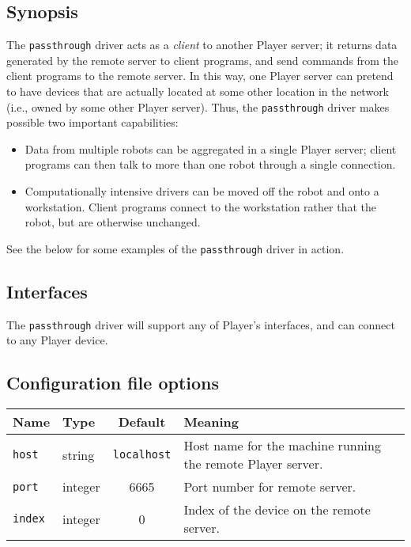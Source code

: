
\subsection*{Synopsis}

The {\tt passthrough} driver acts as a {\em client} to another Player
server; it returns data generated by the remote server to client
programs, and send commands from the client programs to the remote
server.  In this way, one Player server can pretend to have devices
that are actually located at some other location in the network (i.e.,
owned by some other Player server).  Thus, the {\tt passthrough}
driver makes possible two important capabilities:
\begin{itemize}
\item Data from multiple robots can be aggregated in a single Player
server; client programs can then talk to more than one robot through a
single connection.
\item Computationally intensive drivers can be moved off the robot and
onto a workstation.  Client programs connect to the workstation rather
that the robot, but are otherwise unchanged.
\end{itemize}
See the below for some examples of the {\tt passthrough} driver in
action.

\subsection*{Interfaces}

The {\tt passthrough} driver will support any of Player's interfaces,
and can connect to any Player device.


\subsection*{Configuration file options}

\begin{center}
{\small \begin{tabularx}{\columnwidth}{|l|l|c|X|}
\hline
Name & Type & Default & Meaning\\
\hline
{\tt host} & string & {\tt localhost} & Host name for the machine running the remote
Player server.\\
{\tt port} & integer & 6665 & Port number for remote server.\\
{\tt index} & integer & 0 & Index of the device on the remote server.\\
\hline
\end{tabularx}}
\end{center}

